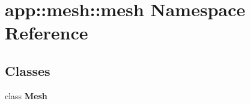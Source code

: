 \section{app::mesh::mesh Namespace Reference}
\label{namespaceapp_1_1mesh_1_1mesh}


\subsection*{Classes}
\begin{CompactItemize}
\item 
class {\bf Mesh}
\end{CompactItemize}
